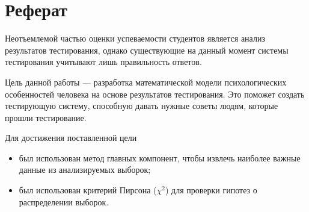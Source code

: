 \chapter*{Реферат}

Неотъемлемой частью оценки успеваемости студентов является анализ результатов
тестирования, однако существующие на данный момент системы тестирования
учитывают лишь правильность ответов.

Цель данной работы --- разработка математической модели психологических
особенностей человека на основе результатов тестирования.
Это поможет создать тестирующую систему, способную давать нужные советы
людям, которые прошли тестирование.

Для достижения поставленной цели
\begin{itemize}
  \item 
    был использован метод главных компонент,
    чтобы извлечь наиболее важные данные из анализируемых выборок;
  \item
    был использован критерий Пирсона ($\chi^2$) для проверки гипотез о
    распределении выборок.
\end{itemize}
